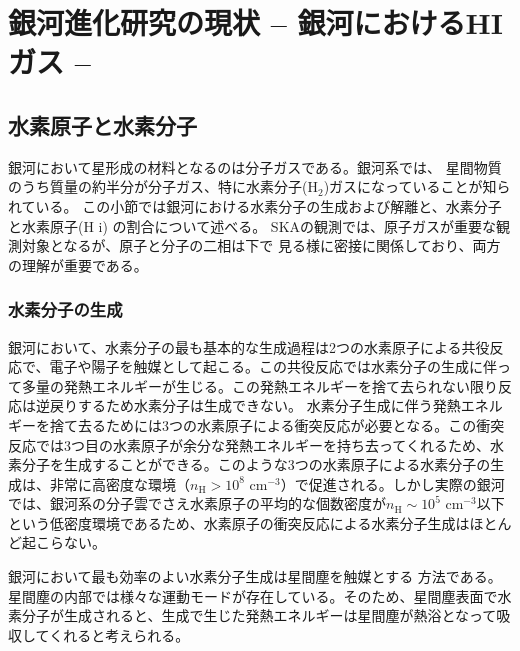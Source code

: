 \section{銀河進化研究の現状 -- 銀河におけるHIガス --}\label{galaxy.s1}

\subsection{水素原子と水素分子}\label{sec:HI_H2}

銀河において星形成の材料となるのは分子ガスである。銀河系では、
星間物質のうち質量の約半分が分子ガス、特に水素分子(H$_2$)ガスになっていることが知られている。
この小節では銀河における水素分子の生成および解離と、水素分子と水素原子(H {\sc i})
の割合について述べる。
SKAの観測では、原子ガスが重要な観測対象となるが、原子と分子の二相は下で
見る様に密接に関係しており、両方の理解が重要である。

\subsubsection{水素分子の生成}
銀河において、水素分子の最も基本的な生成過程は2つの水素原子による共役反応で、電子や陽子を触媒として起こる。この共役反応では水素分子の生成に伴って多量の発熱エネルギーが生じる。この発熱エネルギーを捨て去られない限り反応は逆戻りするため水素分子は生成できない。
水素分子生成に伴う発熱エネルギーを捨て去るためには3つの水素原子による衝突反応が必要となる。この衝突反応では3つ目の水素原子が余分な発熱エネルギーを持ち去ってくれるため、水素分子を生成することができる。このような3つの水素原子による水素分子の生成は、非常に高密度な環境（$n_{\text{H}}>10^8$ cm$^{-3}$）で促進される。しかし実際の銀河では、銀河系の分子雲でさえ水素原子の平均的な個数密度が$n_{\text{H}}\sim10^5$ cm$^{-3}$以下という低密度環境であるため、水素原子の衝突反応による水素分子生成はほとんど起こらない。

銀河において最も効率のよい水素分子生成は星間塵を触媒とする
方法である\citep{1963ApJ...138..393G, 1971ApJ...163..155H}。
星間塵の内部では様々な運動モードが存在している。そのため、星間塵表面で水素分子が生成されると、生成で生じた発熱エネルギーは星間塵が熱浴となって吸収してくれると考えられる。

